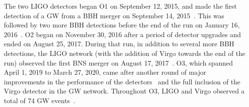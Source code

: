 The two \ac{LIGO} detectors began \ac{O1} on September 12, 2015, and made the first detection of a \ac{GW} from a \ac{BBH} merger on September 14, 2015~\citep{gw150914}.
This was followed by two more \ac{BBH} detections before the end of the run on January 16, 2016~\citep{gwtc1}.
\Ac{O2} began on November 30, 2016 after a period of detector upgrades and ended on August 25, 2017.
During that run, in addition to several more \ac{BBH} detections, the \ac{LIGO} network (with the addition of Virgo towards the end of the run) observed the first \ac{BNS} merger on August 17, 2017~\citep{gw170817}.
\Ac{O3}, which spanned April 1, 2019 to March 27, 2020, came after another round of major improvements in the performance of the detectors~\citep{Buikema_2020} and the full inclusion of the Virgo detector in the \ac{GW} network.
Throughout \ac{O3}, \ac{LIGO} and Virgo observed a total of 74 \ac{GW} events~\citep{gwtc2,gwtc3}.
